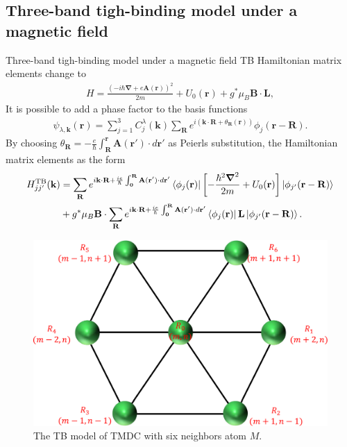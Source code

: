 \documentclass[aspectratio=169,compress,x11names]{beamer}
\begin{document}
	\subsection{Three-band tigh-binding model under a magnetic field}
	\begin{frame}{Three-band tigh-binding model under a magnetic field}
		TB Hamiltonian matrix elements change to
		\begin{gather}
			H= \frac{(-i \hbar \boldsymbol{\nabla} + e \mathbf{A}(\mathbf{r}))^{2}}{2m} + U_{0}(\mathbf{r}) + g^{*} \mu_{B} \mathbf{B} \cdot \mathbf{L},
		\end{gather}
		It is possible to add a phase factor to the basis functions
		\begin{gather}
			\psi_{\lambda,\mathbf{k}}(\mathbf{r}) = \sum_{j=1}^{3} C_{j}^{\lambda}(\mathbf{k}) \sum_{\mathbf{R}} e^{i (\mathbf{k} \cdot \mathbf{R} + \theta_\mathbf{R}(\mathbf{r}))} \phi_{j}(\mathbf{r} - \mathbf{R}).
		\end{gather}
		By choosing $\theta_\mathbf{R} = - \tfrac{e}{\hbar} \int_{\mathbf{R}}^{\mathbf{r}} \mathbf{A}(\mathbf{r'}) \cdot d\mathbf{r}' $ as Peierls substitution, the Hamiltonian matrix elements as the form
		\begin{equation}
			\begin{aligned}
				H_{jj'}^{\text{TB}}(\mathbf{k})
				&= \sum_{\mathbf{R}} e^{i\mathbf{k \cdot R} + \frac{ie}{\hbar} \int_{\mathbf{0}}^{\mathbf{R}} \mathbf{A(\mathbf{r'})} \cdot d \mathbf{r'} } \bra{\phi_{j}(\mathbf{r})} \left[ -\frac{\hbar^{2} \boldsymbol{\nabla}^{2}}{2m} + U_{0} (\mathbf{r}) \right] \ket{\phi_{j'}(\mathbf{r - R})} \\
				&+ g^{*} \mu_{B} \mathbf{B} \cdot \sum_{\mathbf{R}} e^{i\mathbf{k \cdot R} + \frac{ie}{\hbar} \int_{\mathbf{0}}^{\mathbf{R}} \mathbf{A(\mathbf{r'})} \cdot d\mathbf{r'} } \bra{\phi_{j}(\mathbf{r})} \mathbf{L} \ket{\phi_{j'}(\mathbf{r - R})}.
			\end{aligned}
		\end{equation}
	\end{frame}
	\begin{frame}
		\begin{figure}
			\centering
			\includegraphics[width=0.5\linewidth]{./pic/siteindex_crop.pdf}
			\caption{\label{fig:site index} The TB model of TMDC with six neighbors atom $M$.}
		\end{figure}
	\end{frame}
\end{document}
